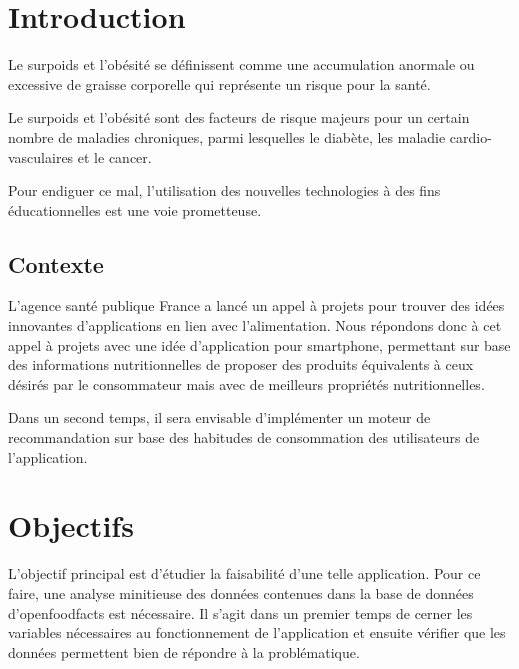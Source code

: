 
\section{Introduction}

  Le surpoids et l'obésité se définissent comme une accumulation anormale ou
  excessive de graisse corporelle qui représente un risque pour la santé.

  Le surpoids et l'obésité sont des facteurs de risque majeurs pour un certain
  nombre de maladies chroniques, parmi lesquelles le diabète, les maladie
  cardio-vasculaires et le cancer. \cite{OMS}

  Pour endiguer ce mal, l'utilisation des nouvelles technologies à des fins
  éducationnelles est une voie prometteuse.

  \subsection{Contexte}

  L'agence santé publique France a lancé un appel à projets pour trouver des
  idées innovantes d'applications en lien avec l'alimentation. Nous répondons
  donc à cet appel à projets avec une idée d'application pour smartphone,
  permettant sur base des informations nutritionnelles de proposer des
  produits équivalents à ceux désirés par le consommateur mais avec de meilleurs
  propriétés nutritionnelles.

  Dans un second temps, il sera envisable d'implémenter un moteur de recommandation
  sur base des habitudes de consommation des utilisateurs de l'application.

\section{Objectifs}

L'objectif principal est d'étudier la faisabilité d'une telle application. Pour
ce faire, une analyse minitieuse des données contenues dans la base de données
d'openfoodfacts est nécessaire. Il s'agit dans un premier temps de cerner les
variables nécessaires au fonctionnement de l'application et ensuite vérifier
que les données permettent bien de répondre à la problématique.

